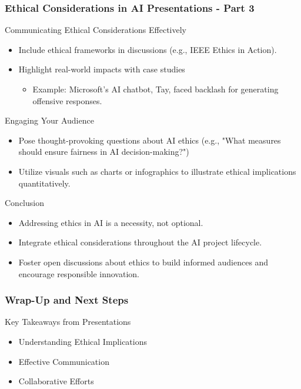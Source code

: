 \documentclass[aspectratio=169]{beamer}
\begin{document}
\begin{frame}[fragile]
    \frametitle{Ethical Considerations in AI Presentations - Part 3}
    \begin{block}{Communicating Ethical Considerations Effectively}
        \begin{itemize}
            \item Include ethical frameworks in discussions (e.g., IEEE Ethics in Action).
            \item Highlight real-world impacts with case studies 
                \begin{itemize}
                    \item Example: Microsoft’s AI chatbot, Tay, faced backlash for generating offensive responses.
                \end{itemize}
        \end{itemize}
        \begin{block}{Engaging Your Audience}
            \begin{itemize}
                \item Pose thought-provoking questions about AI ethics (e.g., "What measures should ensure fairness in AI decision-making?")
                \item Utilize visuals such as charts or infographics to illustrate ethical implications quantitatively.
            \end{itemize}
        \end{block}
        \begin{block}{Conclusion}
            \begin{itemize}
                \item Addressing ethics in AI is a necessity, not optional.
                \item Integrate ethical considerations throughout the AI project lifecycle.
                \item Foster open discussions about ethics to build informed audiences and encourage responsible innovation.
            \end{itemize}
        \end{block}
    \end{block}
\end{frame}

\begin{frame}[fragile]
    \frametitle{Wrap-Up and Next Steps}
    \begin{block}{Key Takeaways from Presentations}
        \begin{itemize}
            \item Understanding Ethical Implications
            \item Effective Communication
            \item Collaborative Efforts
        \end{itemize}
    \end{block}
\end{frame}
\end{document}
